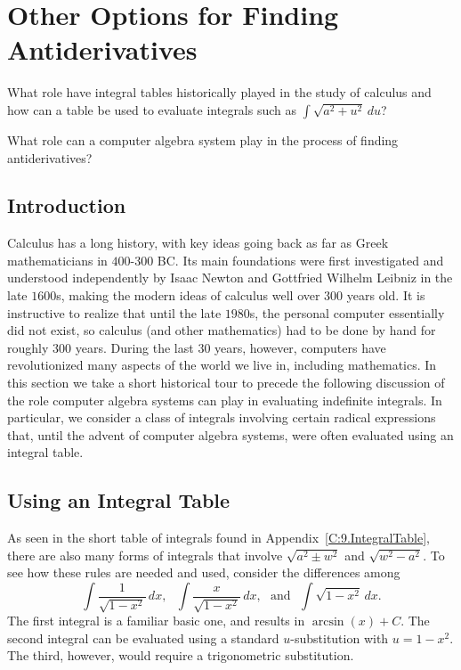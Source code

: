 \section{Other Options for Finding Antiderivatives} \label{S:5.7.OtherOpt}

\begin{goals}
\item What role have integral tables historically played in the study of calculus and how can a table be used to evaluate integrals such as $\int \sqrt{a^2 + u^2} \, du$?
\item What role can a computer algebra system play in the process of finding antiderivatives?
\end{goals}


\subsection*{Introduction}

Calculus has a long history, with key ideas going back as far as Greek mathematicians in $400$-$300$ BC.  Its main foundations were first investigated and understood independently by Isaac Newton and Gottfried Wilhelm Leibniz in the late $1600$s, making the modern ideas of calculus well over $300$ years old.  It is instructive to realize that until the late $1980$s, the personal computer essentially did not exist, so calculus (and other mathematics) had to be done by hand for roughly $300$ years.  During the last $30$ years, however, computers have revolutionized many aspects of the world we live in, including mathematics.  In this section we take a short historical tour to precede the following discussion of the role computer algebra systems can play in evaluating indefinite integrals.  In particular, we consider a class of integrals involving certain radical expressions that, until the advent of computer algebra systems, were often evaluated using an integral table.

\subsection*{Using an Integral Table}

As seen in the short table of integrals found in Appendix~\ref{C:9.IntegralTable}, there are also many forms of integrals that involve $\sqrt{a^2 \pm w^2}$ and $\sqrt{w^2 - a^2}.$  %
To see how these rules are needed and used, consider the differences among
$$\int \frac{1}{\sqrt{1-x^2}} \,dx, \ \ \  \int \frac{x}{\sqrt{1-x^2}} \,dx, \ \ \  \mbox{and} \ \ \ \int \sqrt{1-x^2} \,dx.$$
The first integral is a familiar basic one, and results in $\arcsin(x) + C$.  The second integral can be evaluated using a standard $u$-substitution with $u = 1-x^2$.  The third, however, would require a trigonometric substitution.


